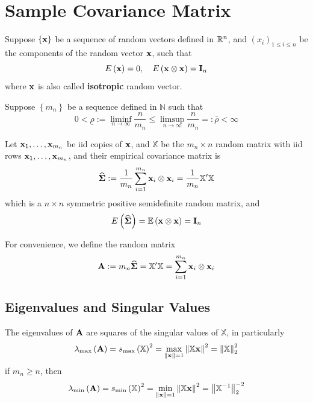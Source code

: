 \chapter{Sample Covariance Matrix}

Suppose $\left\{{\bf x}\right\}$ be a sequence of random vectors defined in ${\mathbb R}^{n}$, and $\left(x_{i}\right)_{1\leq i\leq n}$ be the components of the random vector ${\bf x}$, such that
\begin{equation*}
	E\left({\bf x}\right)=0,\quad E\left({\bf x}\otimes{\bf x}\right)=\mathbf{I}_{n}
\end{equation*}
where ${\bf x}$ is also called \textbf{isotropic} random vector.

Suppose $\left\{m_{n}\right\}$ be a sequence defined in $\mathbb{N}$ such that
\begin{equation*}
	0<\underline{\rho}:=\liminf_{n\rightarrow\infty}\frac{n}{m_{n}}\leq\limsup_{n\rightarrow\infty}\frac{n}{m_{n}}=:\bar{\rho}<\infty
\end{equation*}

Let ${\bf x}_{1},\ldots,{\bf x}_{m_{n}}$ be iid copies of ${\bf x}$, and $\mathbb{X}$ be the $m_{n}\times n$ random matrix with iid rows ${\bf x}_{1},\ldots,{\bf x}_{m_{n}}$, and their empirical covariance matrix is
\begin{equation*}
	\widehat{\boldsymbol{\Sigma}}:=\frac{1}{m_{n}}\sum_{i=1}^{m_{n}}{\bf x}_{i}\otimes{\bf x}_{i}=\frac{1}{m_{n}}\mathbb{X}^{\prime}\mathbb{X}
\end{equation*}
which is a $n\times n$ symmetric positive semidefinite random matrix, and
\begin{equation*}
	E\left(\widehat{\boldsymbol{\Sigma}}\right)={\mathbb E}\left({\bf x}\otimes{\bf x}\right)=\mathbf{I}_{n}
\end{equation*}

For convenience, we define the random matrix
\begin{equation*}
	{\bf A}:=m_{n}\widehat{\boldsymbol{\Sigma}}=\mathbb{X}^{\prime}\mathbb{X}=\sum_{i=1}^{m_{n}}{\bf x}_{i}\otimes{\bf x}_{i}
\end{equation*}

\section{Eigenvalues and Singular Values}

\begin{theorem}
	The eigenvalues of ${\bf A}$ are squares of the singular values of $\mathbb{X}$, in particularly
	\begin{equation*}
		\lambda_{\max}\left({\bf A}\right)=s_{\max}\left(\mathbb{X}\right)^{2}=\max_{\|{\bf x}\|=1}\left\|\mathbb{X}{\bf x}\right\|^{2}=\left\|\mathbb{X}\right\|_{2}^{2}
	\end{equation*}
	if $m_{n}\geq n$, then
	\begin{equation*}
		\lambda_{\min}\left({\bf A}\right)=s_{\min}\left(\mathbb{X}\right)^{2}=\min_{\|{\bf x}\|=1}\left\|\mathbb{X}{\bf x}\right\|^{2}=\left\|\mathbb{X}^{-1}\right\|_{2}^{-2}
	\end{equation*}
\end{theorem}

